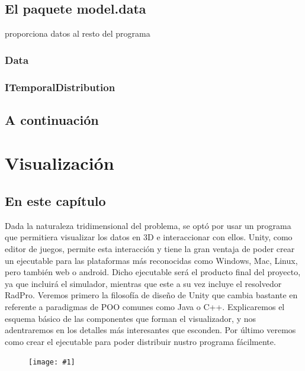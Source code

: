 \documentclass[12pt,a4paper,openright,oneside]{article}
\newcommand{\includeImage}[1]
{
	\begin{figure}[htb]
	\begin{center}
	\texttt{[image: \#1]}
	\end{center}
	\end{figure}
}
\numberwithin{equation}{section}
\theoremstyle{definition}
\begin{document}
\subsection{El paquete model.data}
proporciona datos al resto del programa
\subsubsection{Data}
\subsubsection{ITemporalDistribution}

\subsection{A continuación}
\newpage




\section{Visualización}

\subsection{En este capítulo}
Dada la naturaleza tridimensional del problema, se optó por usar un programa que permitiera visualizar los datos en 3D e interaccionar con ellos. Unity, como editor de juegos, permite esta interacción y tiene la gran ventaja de poder crear un ejecutable para las plataformas más reconocidas como Windows, Mac, Linux, pero también web o android. Dicho ejecutable será el producto final del proyecto, ya que incluirá el simulador, mientras que este a su vez incluye el resolvedor RadPro. Veremos primero la filosofía de diseño de Unity que cambia bastante en referente a paradigmas de POO comunes como Java o C++. Explicaremos el esquema básico de las componentes que forman el visualizador, y nos adentraremos en los detalles más interesantes que esconden. Por último veremos como crear el ejecutable para poder distribuir nustro programa fácilmente.
\includeImage{visualization.png}
\end{document}
